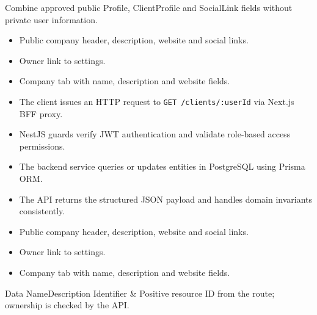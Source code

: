 \noindent Combine approved public Profile, ClientProfile and SocialLink fields without private user information.

\begin{itemize}[leftmargin=1.6em,topsep=3pt,itemsep=2pt,parsep=0pt,label=$\bullet$]
    \item Public company header, description, website and social links.
    \item Owner link to settings.
    \item Company tab with name, description and website fields.
\end{itemize}

\begin{itemize}[leftmargin=1.6em,topsep=3pt,itemsep=2pt,parsep=0pt,label=$\bullet$]
    \item The client issues an HTTP request to \texttt{GET /\allowbreak{}clients/\allowbreak{}:\allowbreak{}userId} via Next.js BFF proxy.
    \item NestJS guards verify JWT authentication and validate role-based access permissions.
    \item The backend service queries or updates entities in PostgreSQL using Prisma ORM.
    \item The API returns the structured JSON payload and handles domain invariants consistently.
\end{itemize}

\begin{itemize}[leftmargin=1.6em,topsep=3pt,itemsep=2pt,parsep=0pt,label=$\bullet$]
    \item Public company header, description, website and social links.
    \item Owner link to settings.
    \item Company tab with name, description and website fields.
\end{itemize}


\begin{specdatatable}{Data Name}{Description}
Identifier & Positive resource ID from the route; ownership is checked by the API.\\ \hline
\end{specdatatable}


